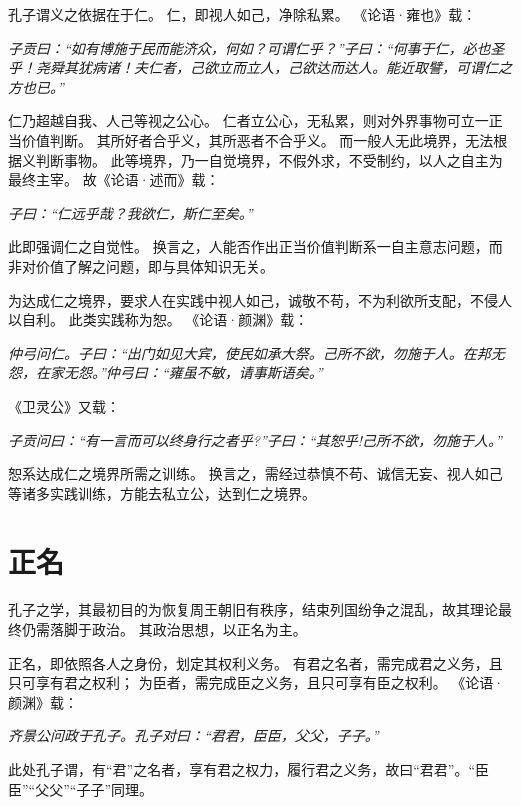 \documentclass[11pt]{article}
\begin{document}
\newline

孔子谓义之依据在于仁。
仁，即视人如己，净除私累。
《论语·雍也》载：

\textit{子贡曰：“如有博施于民而能济众，何如？可谓仁乎？”子曰：“何事于仁，必也圣乎！尧舜其犹病诸！夫仁者，己欲立而立人，己欲达而达人。能近取譬，可谓仁之方也已。”}

仁乃超越自我、人己等视之公心。
仁者立公心，无私累，则对外界事物可立一正当价值判断。
其所好者合乎义，其所恶者不合乎义。
而一般人无此境界，无法根据义判断事物。
此等境界，乃一自觉境界，不假外求，不受制约，以人之自主为最终主宰。
故《论语·述而》载：

\textit{子曰：“仁远乎哉？我欲仁，斯仁至矣。”}

此即强调仁之自觉性。
换言之，人能否作出正当价值判断系一自主意志问题，而非对价值了解之问题，即与具体知识无关。

\newline

为达成仁之境界，要求人在实践中视人如己，诚敬不苟，不为利欲所支配，不侵人以自利。
此类实践称为恕。
《论语·颜渊》载：

\textit{仲弓问仁。子曰：“出门如见大宾，使民如承大祭。己所不欲，勿施于人。在邦无怨，在家无怨。”仲弓曰：“雍虽不敏，请事斯语矣。”}

《卫灵公》又载：

\textit{子贡问曰：“有一言而可以终身行之者乎?”子曰：“其恕乎!己所不欲，勿施于人。”}

恕系达成仁之境界所需之训练。
换言之，需经过恭慎不苟、诚信无妄、视人如己等诸多实践训练，方能去私立公，达到仁之境界。

\section{正名}
孔子之学，其最初目的为恢复周王朝旧有秩序，结束列国纷争之混乱，故其理论最终仍需落脚于政治。
其政治思想，以正名为主。

\newline

正名，即依照各人之身份，划定其权利义务。
有君之名者，需完成君之义务，且只可享有君之权利；
为臣者，需完成臣之义务，且只可享有臣之权利。
《论语·颜渊》载：

\textit{齐景公问政于孔子。孔子对曰：“君君，臣臣，父父，子子。”}

此处孔子谓，有“君”之名者，享有君之权力，履行君之义务，故曰“君君”。“臣臣”“父父”“子子”同理。

\newline
\end{document}
